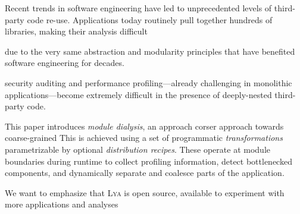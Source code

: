 \documentclass[letterpaper,twocolumn,10pt]{article}
\newcommand{\sys}{{\scshape Lya}\xspace}
\begin{document}
Recent trends in software engineering have led to unprecedented levels of third-party code re-use.
Applications today routinely pull together hundreds of libraries, making their analysis difficult 

due to the very same abstraction and modularity principles that have benefited software engineering for decades.

security auditing and performance profiling---already challenging in monolithic applications---become extremely difficult in the presence of deeply-nested third-party code.

This paper introduces \emph{module dialysis}, an approach 
corser
approach towards coarse-grained
This is achieved using a set of programmatic \emph{transformations} parametrizable by optional \emph{distribution recipes}.
These operate at module boundaries during runtime to collect profiling information, detect bottlenecked components, and dynamically separate and coalesce parts of the application.

We want to emphasize that \sys is open source, available to experiment with more applications and analyses




\end{document}
